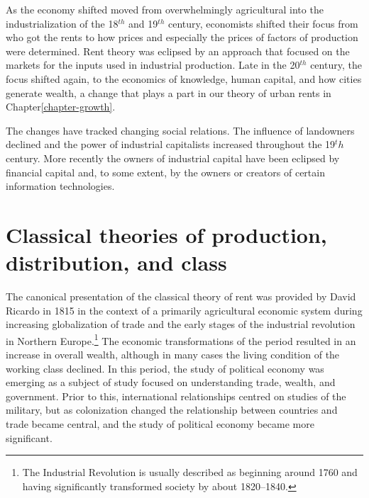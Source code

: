  As the economy shifted  moved from overwhelmingly  agricultural into the industrialization of the 18$^{th}$  and 19$^{th}$ century, economists shifted their focus from who got the rents to how prices and especially the prices of factors of production were determined. Rent theory was eclipsed by an approach that focused on the markets for the inputs used in industrial production.  Late in the 20$^{th}$ century, the focus shifted again, to the economics of  knowledge, human capital, and how cities generate wealth, a change that plays a part in  our theory of urban rents in Chapter\ref{chapter-growth}. 
 
 The changes have tracked changing social relations. The influence of landowners declined and the power of  industrial capitalists increased throughout the 19$^th$ century. More recently the owners of industrial capital have been eclipsed  by financial capital and, to some extent, by the owners or creators of certain information technologies.





\section{Classical theories of production, distribution, and class}

The canonical presentation of the classical theory of rent \cite{ricardoEssayInfluenceLow1815} was provided  by David Ricardo in 1815 in the context of a primarily agricultural economic system during increasing globalization of trade and  the early stages of the industrial revolution in Northern Europe.\footnote{The Industrial Revolution is usually described as beginning around 1760 and having significantly transformed society by about 1820–1840.}  The economic transformations of the period resulted in an increase in overall wealth, although in many cases the living condition of the working class declined.  In this period, the study of \gls{political economy} was emerging as a subject of study focused on understanding trade, wealth, and government. Prior to this, international relationships centred on studies of the military, but as colonization changed the relationship between countries and trade became central, and the study of political economy became more significant. 


